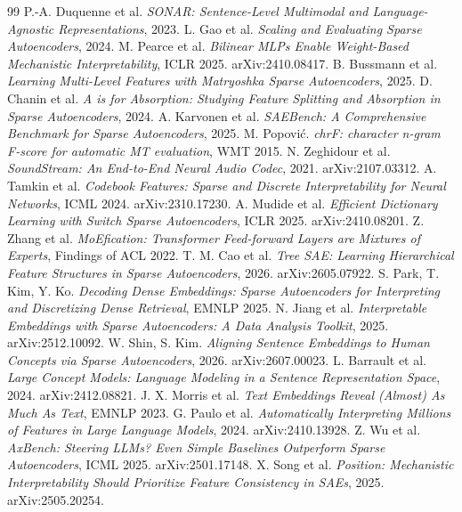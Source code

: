 \documentclass[11pt]{article}
\begin{document}
\begin{thebibliography}{99}
 P.-A. Duquenne et al. \emph{SONAR: Sentence-Level
Multimodal and Language-Agnostic Representations}, 2023.
 L. Gao et al. \emph{Scaling and Evaluating Sparse
Autoencoders}, 2024.
 M. Pearce et al. \emph{Bilinear MLPs Enable
Weight-Based Mechanistic Interpretability}, ICLR 2025. arXiv:2410.08417.
 B. Bussmann et al. \emph{Learning Multi-Level
Features with Matryoshka Sparse Autoencoders}, 2025.
 D. Chanin et al. \emph{A is for Absorption: Studying
Feature Splitting and Absorption in Sparse Autoencoders}, 2024.
 A. Karvonen et al. \emph{SAEBench: A Comprehensive
Benchmark for Sparse Autoencoders}, 2025.
 M. Popovi\'c. \emph{chrF: character n-gram F-score
for automatic MT evaluation}, WMT 2015.
 N. Zeghidour et al. \emph{SoundStream: An
End-to-End Neural Audio Codec}, 2021. arXiv:2107.03312.
 A. Tamkin et al. \emph{Codebook Features: Sparse and
Discrete Interpretability for Neural Networks}, ICML 2024.
arXiv:2310.17230.
 A. Mudide et al. \emph{Efficient Dictionary Learning
with Switch Sparse Autoencoders}, ICLR 2025. arXiv:2410.08201.
 Z. Zhang et al. \emph{MoEfication: Transformer
Feed-forward Layers are Mixtures of Experts}, Findings of ACL 2022.
 T. M. Cao et al. \emph{Tree SAE: Learning Hierarchical
Feature Structures in Sparse Autoencoders}, 2026. arXiv:2605.07922.
 S. Park, T. Kim, Y. Ko. \emph{Decoding Dense
Embeddings: Sparse Autoencoders for Interpreting and Discretizing Dense
Retrieval}, EMNLP 2025.
 N. Jiang et al. \emph{Interpretable Embeddings with
Sparse Autoencoders: A Data Analysis Toolkit}, 2025. arXiv:2512.10092.
 W. Shin, S. Kim. \emph{Aligning Sentence Embeddings to
Human Concepts via Sparse Autoencoders}, 2026. arXiv:2607.00023.
 L. Barrault et al. \emph{Large Concept Models: Language
Modeling in a Sentence Representation Space}, 2024. arXiv:2412.08821.
 J. X. Morris et al. \emph{Text Embeddings Reveal
(Almost) As Much As Text}, EMNLP 2023.
 G. Paulo et al. \emph{Automatically Interpreting
Millions of Features in Large Language Models}, 2024. arXiv:2410.13928.
 Z. Wu et al. \emph{AxBench: Steering LLMs? Even Simple
Baselines Outperform Sparse Autoencoders}, ICML 2025. arXiv:2501.17148.
 X. Song et al. \emph{Position: Mechanistic
Interpretability Should Prioritize Feature Consistency in SAEs}, 2025.
arXiv:2505.20254.
\end{thebibliography}
\end{document}
